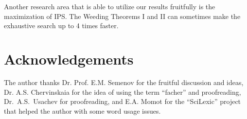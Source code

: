 \documentclass[a4paper,14pt]{article} %
\theoremstyle{plain}
\theoremstyle{definition}
\begin{document}
	Another research area that is able to utilize our results fruitfully is the maximization of IPS.
	The Weeding Theorems I and II can sometimes make the exhaustive search up to 4 times faster.




\section{Acknowledgements}
The author thanks Dr. Prof. E.M. Semenov for the fruitful discussion and ideas,
Dr. A.S. Chervinskaia for the idea of using the term ``facher'' and proofreading,
Dr.~A.S.~Usachev for proofreading,
and E.A. Momot for the ``SciLexic'' project that helped the author with some word usage issues.





\end{document}
